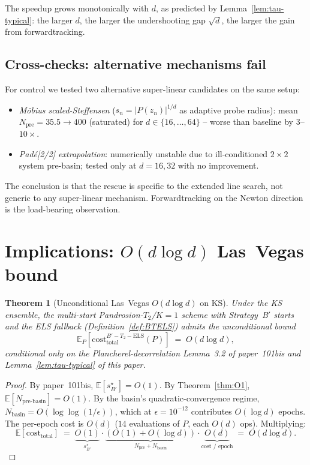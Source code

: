 \documentclass[11pt,a4paper]{article}
\newtheorem{theorem}{Theorem}[section]
\begin{document}
The speedup grows monotonically with $d$, as predicted by Lemma~\ref{lem:tau-typical}: the larger $d$, the larger the undershooting gap $\sqrt d$, the larger the gain from forwardtracking.

\subsection{Cross-checks: alternative mechanisms fail}

For control we tested two alternative super-linear candidates on the same setup:
\begin{itemize}
\item \emph{Möbius scaled-Steffensen} ($s_n = |P(z_n)|^{1/d}$ as adaptive probe radius): mean $N_{\text{pre}} = 35.5 \to 400$ (saturated) for $d \in \{16, \dots, 64\}$ -- worse than baseline by $3$--$10\times$.
\item \emph{Padé[2/2] extrapolation}: numerically unstable due to ill-conditioned $2\times 2$ system pre-basin; tested only at $d = 16, 32$ with no improvement.
\end{itemize}
The conclusion is that the rescue is specific to the extended line search, not generic to any super-linear mechanism. Forwardtracking on the Newton direction is the load-bearing observation.

\section{Implications: $O(d \log d)$ Las~Vegas bound}\label{sec:final}

\begin{theorem}[Unconditional Las~Vegas $O(d\log d)$ on KS]\label{thm:final}
Under the KS ensemble, the multi-start Pandrosion-$T_2$/$K{=}1$ scheme with Strategy~B$'$ starts and the ELS fallback (Definition~\ref{def:BTELS}) admits the unconditional bound
\begin{equation}\label{eq:dlogd}
\mathbb{E}_{P}[\mathrm{cost}^{B'-T_2-\text{ELS}}_{\text{total}}(P)] \;=\; O(d \log d),
\end{equation}
conditional only on the Plancherel-decorrelation Lemma~3.2 of paper~101bis and Lemma~\ref{lem:tau-typical} of this paper.
\end{theorem}

\begin{proof}
By paper~101bis, $\mathbb{E}[s^\star_{B'}] = O(1)$. By Theorem~\ref{thm:O1}, $\mathbb{E}[N_{\text{pre-basin}}] = O(1)$. By the basin's quadratic-convergence regime, $N_{\text{basin}} = O(\log\log(1/\epsilon))$, which at $\epsilon = 10^{-12}$ contributes $O(\log d)$ epochs. The per-epoch cost is $O(d)$ ($14$ evaluations of $P$, each $O(d)$ ops). Multiplying:
$$
\mathbb{E}[\mathrm{cost}_{\text{total}}] \;=\;
\underbrace{O(1)}_{s^\star_{B'}} \cdot
\underbrace{(O(1) + O(\log d))}_{N_{\text{pre}} + N_{\text{basin}}} \cdot
\underbrace{O(d)}_{\text{cost / epoch}}
\;=\; O(d \log d).
$$
\end{proof}
\end{document}
